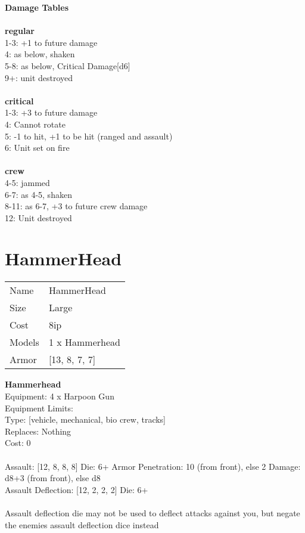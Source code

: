 {\bf Damage Tables} \\
\ \\ {\bf regular } \\
1-3: +1 to future damage \\
4: as below, shaken \\
5-8: as below, Critical Damage[d6] \\
9+: unit destroyed \\
\ \\ {\bf critical } \\
1-3: +3 to future damage \\
4: Cannot rotate \\
5: -1 to hit, +1 to be hit (ranged and assault) \\
6: Unit set on fire \\
\ \\ {\bf crew } \\
4-5: jammed \\
6-7: as 4-5, shaken \\
8-11: as 6-7, +3 to future crew damage \\
12: Unit destroyed \\










\pagebreak\pagebreak

\section{ HammerHead }

\begin{tabular}{ll}
  Name & HammerHead \\
  Size & Large\\
  Cost & 8ip\\
  Models & 1 x Hammerhead\\
  Armor & [13, 8, 7, 7]\\
\end{tabular}

\noindent 

{\bf Hammerhead } \\
Equipment: 4 x Harpoon Gun \\
Equipment Limits:  \\
Type: [vehicle, mechanical, bio crew, tracks] \\
Replaces: Nothing \\
Cost: 0\\
\ \\
Assault: [12, 8, 8, 8] Die: 6+ Armor Penetration: 10 (from front), else 2 Damage: d8+3 (from front), else d8 \\
Assault Deflection: [12, 2, 2, 2] Die: 6+\\
\\ 
Assault deflection die may not be used to deflect attacks against you, but negate the enemies assault deflection dice instead\\ 
 
